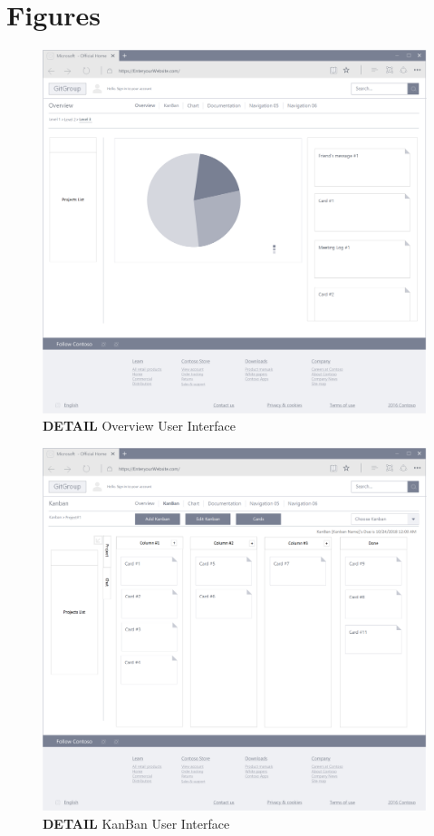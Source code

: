 \documentclass[12pt,a4paper]{report}
\begin{document}
\cleardoublepage
\appendix
\chapter{Figures}%

\begin{figure}[h]
	\centering
	\includegraphics[width=\textwidth]{./pics/OverviewInterface.png}
	\caption{\textbf{DETAIL} Overview User Interface}
\end{figure}

\begin{figure}[h]
	\centering
	\includegraphics[width=\textwidth]{./pics/KanbanInterface.png}
	\caption{\textbf{DETAIL} KanBan User Interface}
\end{figure}
\end{document}
